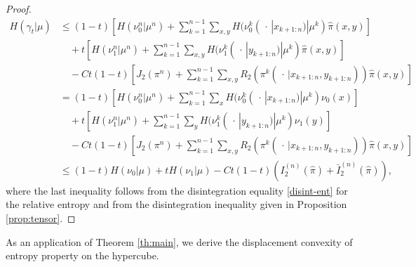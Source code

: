 \documentclass[11pt]{amsart}
\numberwithin{equation}{section}
\begin{document}
\begin{proof}
\begin{align*}
H(\gamma_{t}|\mu) &\leq (1-t) \left[H(\nu_{0}^n |\mu^n) +\sum_{k=1}^{n-1} \sum_{x, y} H(\nu_{0}^{k}(\,\cdot\,|x_{k+1:n}) | \mu^{k}) \hat{\pi}(x,y) \right] \\
&\quad+ t\left[H(\nu_{1}^n | \mu^n) +\sum_{k=1}^{n-1} \sum_{x, y} H(\nu_{1}^{k}(\,\cdot\,| y_{k+1:n}) | \mu^{k}) \hat{\pi}(x,y)\right]\\
&\quad - Ct(1-t)\left[J_{2}(\pi^n) + \sum_{k=1}^{n-1} \sum_{x,y}R_{2}(\pi^k(\,\cdot\,| x_{k+1:n}, y_{k+1:n}))\hat{\pi}(x,y)\right]\\
&= (1-t) \left[H(\nu_{0}^n |\mu^n) +\sum_{k=1}^{n-1} \sum_{x} H(\nu_{0}^{k}(\,\cdot\,|x_{k+1:n}) | \mu^{k})\nu_{0}(x) \right] \\
&\quad+ t\left[H(\nu_{1}^n | \mu^n) +\sum_{k=1}^{n-1} \sum_{y} H(\nu_{1}^{k}(\,\cdot\,| y_{k+1:n}) | \mu^{k}) \nu_{1}(y)\right]\\
&\quad - Ct(1-t)\left[J_{2}(\pi^n) + \sum_{k=1}^{n-1}\sum_{x,y} R_{2}(\pi^k(\,\cdot\,| x_{k+1:n}, y_{k+1:n}))\hat{\pi}(x,y)\right]\\
&\leq (1-t)H(\nu_{0}|\mu) + tH(\nu_{1}|\mu) - Ct(1-t) (I_{2}^{(n)}(\hat{\pi})+\bar{I}_{2}^{(n)}(\hat{\pi})),
\end{align*}
where the last inequality follows from the disintegration equality \eqref{disint-ent} for the relative entropy and from the disintegration inequality given in Proposition \ref{prop:tensor}.
\end{proof}

As an application of Theorem \ref{th:main}, we derive the displacement convexity of  entropy property on the hypercube.
\end{document}
